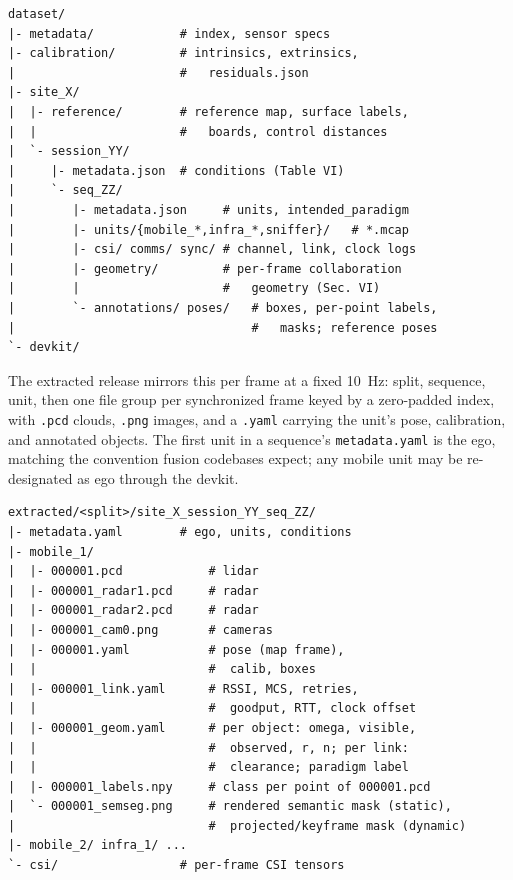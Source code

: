 \documentclass[conference]{IEEEtran}
\begin{document}
{\scriptsize
\begin{verbatim}
dataset/
|- metadata/            # index, sensor specs
|- calibration/         # intrinsics, extrinsics,
|                       #   residuals.json
|- site_X/
|  |- reference/        # reference map, surface labels,
|  |                    #   boards, control distances
|  `- session_YY/
|     |- metadata.json  # conditions (Table VI)
|     `- seq_ZZ/
|        |- metadata.json     # units, intended_paradigm
|        |- units/{mobile_*,infra_*,sniffer}/   # *.mcap
|        |- csi/ comms/ sync/ # channel, link, clock logs
|        |- geometry/         # per-frame collaboration
|        |                    #   geometry (Sec. VI)
|        `- annotations/ poses/   # boxes, per-point labels,
|                                 #   masks; reference poses
`- devkit/
\end{verbatim}
}

The extracted release mirrors this per frame at a fixed
\SI{10}{\hertz}: split, sequence, unit, then one file group per
synchronized frame keyed by a zero-padded index, with \texttt{.pcd}
clouds, \texttt{.png} images, and a \texttt{.yaml} carrying the
unit's pose, calibration, and annotated objects. The first unit in a
sequence's \texttt{metadata.yaml} is the ego, matching the convention
fusion codebases expect; any mobile unit may be re-designated as ego
through the devkit.

{\scriptsize
\begin{verbatim}
extracted/<split>/site_X_session_YY_seq_ZZ/
|- metadata.yaml        # ego, units, conditions
|- mobile_1/
|  |- 000001.pcd            # lidar
|  |- 000001_radar1.pcd     # radar
|  |- 000001_radar2.pcd     # radar
|  |- 000001_cam0.png       # cameras
|  |- 000001.yaml           # pose (map frame),
|  |                        #  calib, boxes
|  |- 000001_link.yaml      # RSSI, MCS, retries,
|  |                        #  goodput, RTT, clock offset
|  |- 000001_geom.yaml      # per object: omega, visible,
|  |                        #  observed, r, n; per link:
|  |                        #  clearance; paradigm label
|  |- 000001_labels.npy     # class per point of 000001.pcd
|  `- 000001_semseg.png     # rendered semantic mask (static),
|                           #  projected/keyframe mask (dynamic)
|- mobile_2/ infra_1/ ...
`- csi/                 # per-frame CSI tensors
\end{verbatim}
}
\end{document}
